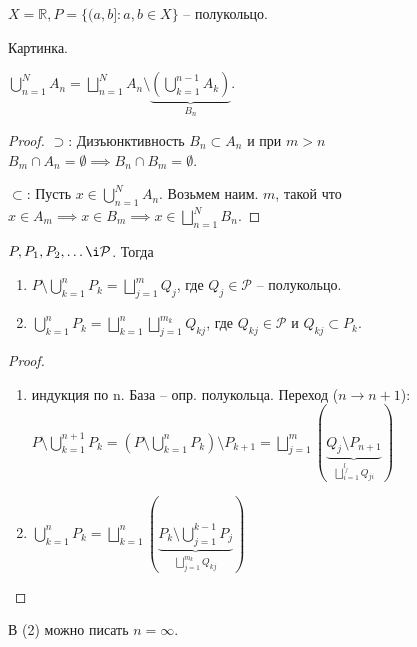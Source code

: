 \begin{example}
    $X = \mathbb{R}, P = \{(a, b] : a, b \in X\}$ -- полукольцо.

    Картинка.
\end{example}

\begin{lemma}
    $\bigcup_{n=1}^{N} A_n = \bigsqcup_{n=1}^{N}A_n \setminus \underbrace{\left(\bigcup_{k=1}^{n-1}A_k\right)}_{B_n}$.
\end{lemma}
\begin{proof}
    $\supset$: Дизъюнктивность $B_n \subset A_n $ и при $m > n$ $B_m \cap A_n = \emptyset \implies B_n \cap B_m = \emptyset$.
    
    $\subset$: Пусть $x \in \bigcup_{n=1}^{N} A_n$. Возьмем наим. $m$, такой что $x \in A_m \implies x \in B_m \implies x \in \bigsqcup_{n=1}^{N} B_n$.
\end{proof}

\begin{theorem}
    $P, P_1, P_2, \dots \i \mathcal{P}$. Тогда 

    \begin{enumerate}
        \item $P \setminus \bigcup_{k=1}^{n} P_k = \bigsqcup_{j=1}^m Q_j$, где $Q_j \in \mathcal{P}$ -- полукольцо.
        \item $\bigcup_{k=1}^{n} P_k = \bigsqcup_{k=1}^{n} \bigsqcup_{j=1}^{m_k} Q_{kj}$, где $Q_{kj} \in \mathcal{P}$ и $Q_{kj} \subset P_k$. 
    \end{enumerate}
\end{theorem}

\begin{proof}
    \begin{enumerate}
        \item индукция по n. База -- опр. полукольца. Переход ($n \rightarrow n+1$): $P \setminus \bigcup_{k=1}^{n+1}P_k = \left(P \setminus \bigcup_{k=1}^nP_k\right) \setminus P_{k+1} = \bigsqcup_{j=1}^{m} \left(\underbrace{Q_j \setminus P_{n+1}}_{\bigsqcup_{i=1}^{l_j}Q_{ji}}\right)$
        \item $\bigcup_{k=1}^{n} P_k = \bigsqcup_{k=1}^{n} \left(\underbrace{P_k \setminus \bigcup_{j=1}^{k-1} P_j}_{\bigsqcup_{j=1}^{m_k} Q_{kj}}\right)$
    \end{enumerate}
\end{proof}

\begin{remark}
    В (2) можно писать $n = \infty$.
\end{remark}

